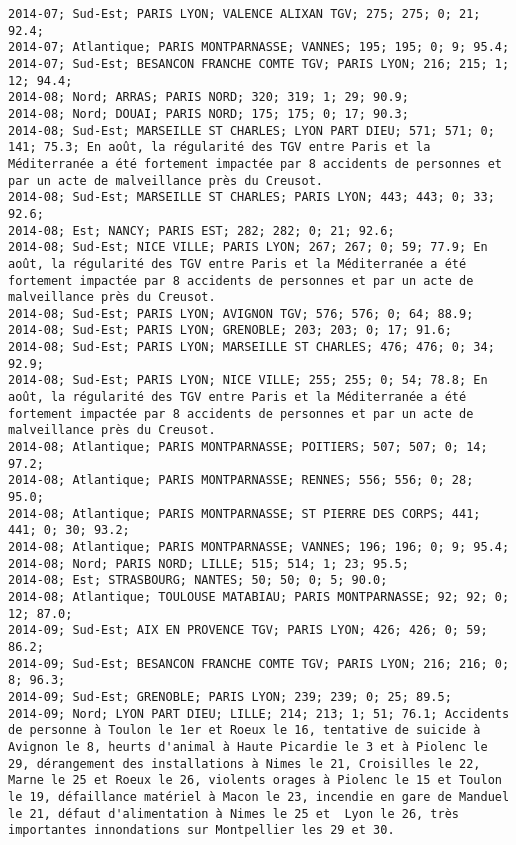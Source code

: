\documentclass{article}
\begin{document}
\begin{Verbatim}[commandchars=\\\{\}]
2014-07; Sud-Est; PARIS LYON; VALENCE ALIXAN TGV; 275; 275; 0; 21; 92.4; 
2014-07; Atlantique; PARIS MONTPARNASSE; VANNES; 195; 195; 0; 9; 95.4; 
2014-07; Sud-Est; BESANCON FRANCHE COMTE TGV; PARIS LYON; 216; 215; 1; 12; 94.4; 
2014-08; Nord; ARRAS; PARIS NORD; 320; 319; 1; 29; 90.9; 
2014-08; Nord; DOUAI; PARIS NORD; 175; 175; 0; 17; 90.3; 
2014-08; Sud-Est; MARSEILLE ST CHARLES; LYON PART DIEU; 571; 571; 0; 141; 75.3; En août, la régularité des TGV entre Paris et la Méditerranée a été fortement impactée par 8 accidents de personnes et par un acte de malveillance près du Creusot.
2014-08; Sud-Est; MARSEILLE ST CHARLES; PARIS LYON; 443; 443; 0; 33; 92.6; 
2014-08; Est; NANCY; PARIS EST; 282; 282; 0; 21; 92.6; 
2014-08; Sud-Est; NICE VILLE; PARIS LYON; 267; 267; 0; 59; 77.9; En août, la régularité des TGV entre Paris et la Méditerranée a été fortement impactée par 8 accidents de personnes et par un acte de malveillance près du Creusot.
2014-08; Sud-Est; PARIS LYON; AVIGNON TGV; 576; 576; 0; 64; 88.9; 
2014-08; Sud-Est; PARIS LYON; GRENOBLE; 203; 203; 0; 17; 91.6; 
2014-08; Sud-Est; PARIS LYON; MARSEILLE ST CHARLES; 476; 476; 0; 34; 92.9; 
2014-08; Sud-Est; PARIS LYON; NICE VILLE; 255; 255; 0; 54; 78.8; En août, la régularité des TGV entre Paris et la Méditerranée a été fortement impactée par 8 accidents de personnes et par un acte de malveillance près du Creusot.
2014-08; Atlantique; PARIS MONTPARNASSE; POITIERS; 507; 507; 0; 14; 97.2; 
2014-08; Atlantique; PARIS MONTPARNASSE; RENNES; 556; 556; 0; 28; 95.0; 
2014-08; Atlantique; PARIS MONTPARNASSE; ST PIERRE DES CORPS; 441; 441; 0; 30; 93.2; 
2014-08; Atlantique; PARIS MONTPARNASSE; VANNES; 196; 196; 0; 9; 95.4; 
2014-08; Nord; PARIS NORD; LILLE; 515; 514; 1; 23; 95.5; 
2014-08; Est; STRASBOURG; NANTES; 50; 50; 0; 5; 90.0; 
2014-08; Atlantique; TOULOUSE MATABIAU; PARIS MONTPARNASSE; 92; 92; 0; 12; 87.0; 
2014-09; Sud-Est; AIX EN PROVENCE TGV; PARIS LYON; 426; 426; 0; 59; 86.2; 
2014-09; Sud-Est; BESANCON FRANCHE COMTE TGV; PARIS LYON; 216; 216; 0; 8; 96.3; 
2014-09; Sud-Est; GRENOBLE; PARIS LYON; 239; 239; 0; 25; 89.5; 
2014-09; Nord; LYON PART DIEU; LILLE; 214; 213; 1; 51; 76.1; Accidents de personne à Toulon le 1er et Roeux le 16, tentative de suicide à Avignon le 8, heurts d'animal à Haute Picardie le 3 et à Piolenc le 29, dérangement des installations à Nimes le 21, Croisilles le 22, Marne le 25 et Roeux le 26, violents orages à Piolenc le 15 et Toulon le 19, défaillance matériel à Macon le 23, incendie en gare de Manduel le 21, défaut d'alimentation à Nimes le 25 et  Lyon le 26, très importantes innondations sur Montpellier les 29 et 30.

\end{Verbatim}
\end{document}
